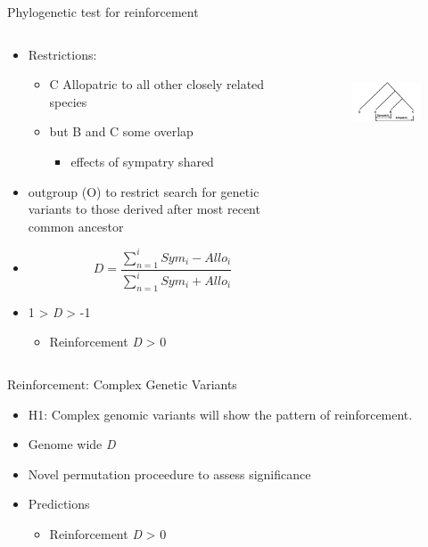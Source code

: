 \documentclass[t,10pt]{beamer}
\begin{document}
\begin{frame}[label={sec:orgheadline37}]{Phylogenetic test for reinforcement}
\begin{columns}
\begin{column}{0.5\columnwidth}
\begin{itemize}[<+->]
\item Restrictions:
\begin{itemize}
\item C Allopatric to all other closely related species
\item but B and C some overlap 
\begin{itemize}
\item effects of sympatry shared
\end{itemize}
\end{itemize}
\item outgroup (O) to restrict search for genetic variants to those derived after most recent common ancestor
\item \[D=\frac{\sum_{n=1}^{i} Sym_{i}-Allo_{i}}{\sum_{n=1}^{i} Sym_{i}+Allo_{i}}\]
\item 1 > \emph{D} > -1
\begin{itemize}
\item Reinforcement \emph{D} > 0
\end{itemize}
\end{itemize}
\end{column}
\begin{column}{0.5\columnwidth}
\begin{figure}[htb]
\centering
\includegraphics[width=2.5in,height=1.3in]{./Figures/Biogeography_of_Speciation_phylogeny.png}
\end{figure}
\end{column}
\end{columns}
\end{frame}
\begin{frame}[label={sec:orgheadline38}]{Reinforcement: Complex Genetic Variants}
\begin{itemize}[<+->]
\item H1: Complex genomic variants will show the pattern of \alert{reinforcement}. \vspace{0.25in}
\item Genome wide \emph{D}
\item Novel permutation proceedure to assess significance
\item Predictions
\begin{itemize}
\item Reinforcement \emph{D} > 0
\end{itemize}
\end{itemize}
\end{frame}
\end{document}
